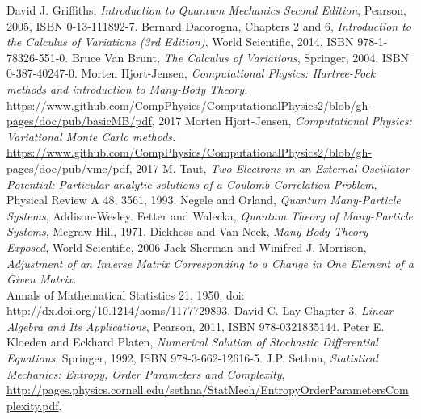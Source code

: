 \begin{thebibliography}{}
        David J. Griffiths,
        \textit{Introduction to Quantum Mechanics Second Edition},
        Pearson, 2005, ISBN 0-13-111892-7.
        Bernard Dacorogna, Chapters 2 and 6,
        \textit{Introduction to the Calculus of Variations (3rd Edition)},
        World Scientific, 2014, ISBN 978-1-78326-551-0.
        Bruce Van Brunt,
        \textit{The Calculus of Variations},
        Springer, 2004, ISBN 0-387-40247-0.
        Morten Hjort-Jensen,
        \textit{Computational Physics: Hartree-Fock methods and introduction to Many-Body Theory.} \\
        \url{https://www.github.com/CompPhysics/ComputationalPhysics2/blob/gh-pages/doc/pub/basicMB/pdf}, 2017
        Morten Hjort-Jensen,
        \textit{Computational Physics: Variational Monte Carlo methods.} \\
        \url{https://www.github.com/CompPhysics/ComputationalPhysics2/blob/gh-pages/doc/pub/vmc/pdf}, 2017
        M. Taut, 
        \textit{Two Electrons in an External Oscillator Potential; Particular analytic solutions of a Coulomb Correlation Problem},
        Physical Review A 48, 3561, 1993.
        Negele and Orland,
        \textit{Quantum Many-Particle Systems},
        Addison-Wesley.
        Fetter and Walecka,
        \textit{Quantum Theory of Many-Particle Systems},
        Mcgraw-Hill, 1971.
        Dickhoss and Van Neck,
        \textit{Many-Body Theory Exposed},
        World Scientific, 2006
        Jack Sherman and Winifred J. Morrison,
        \textit{Adjustment of an Inverse Matrix Corresponding to a Change in One Element of a Given Matrix.} \\
        Annals of Mathematical Statistics 21, 1950. doi: \url{http://dx.doi.org/10.1214/aoms/1177729893}.
        David C. Lay Chapter 3,
        \textit{Linear Algebra and Its Applications},
        Pearson, 2011, ISBN 978-0321835144.
        Peter E. Kloeden and Eckhard Platen,
        \textit{Numerical Solution of Stochastic Differential Equations},
        Springer, 1992, ISBN 978-3-662-12616-5.
        J.P. Sethna,
        \textit{Statistical Mechanics: Entropy, Order Parameters and Complexity},
        \url{http://pages.physics.cornell.edu/sethna/StatMech/EntropyOrderParametersComplexity.pdf}.
\end{thebibliography}
